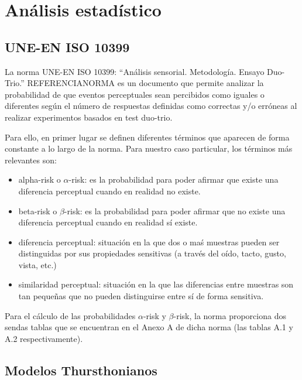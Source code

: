 \documentclass[11pt,a4paper,twoside]{book}
\author{Víctor de Tejada Molera}
\begin{document}
\chapter{Análisis estadístico}    
        
    \section{UNE-EN ISO 10399}
        La norma UNE-EN ISO 10399: ``Análisis sensorial. Metodología. Ensayo Duo-Trio.'' REFERENCIANORMA es un documento que permite analizar la probabilidad de que eventos perceptuales sean percibidos como iguales o diferentes según el número de respuestas definidas como correctas y/o erróneas al realizar experimentos basados en test duo-trio.
        
        Para ello, en primer lugar se definen diferentes términos que aparecen de forma constante a lo largo de la norma. Para nuestro caso particular, los términos más relevantes son:
        
        \begin{itemize}
            \item alpha-risk o $\alpha$-risk: es la probabilidad para poder afirmar que existe una diferencia perceptual cuando en realidad no existe.
            \item beta-risk o $\beta$-risk: es la probabilidad para poder afirmar que no existe una diferencia perceptual cuando en realidad sí existe.
            \item diferencia perceptual: situación en la que dos o maś muestras pueden ser distinguidas por sus propiedades sensitivas (a través del oído, tacto, gusto, vista, etc.)
            \item similaridad perceptual: situación en la que las diferencias entre muestras son tan pequeñas que no pueden distinguirse entre sí de forma sensitiva.
        \end{itemize}
        Para el cálculo de las probabilidades $\alpha$-risk y $\beta$-risk, la norma proporciona dos sendas tablas que se encuentran en el Anexo A de dicha norma (las tablas A.1 y A.2 respectivamente).
    \section{Modelos Thursthonianos}
    
\end{document}
